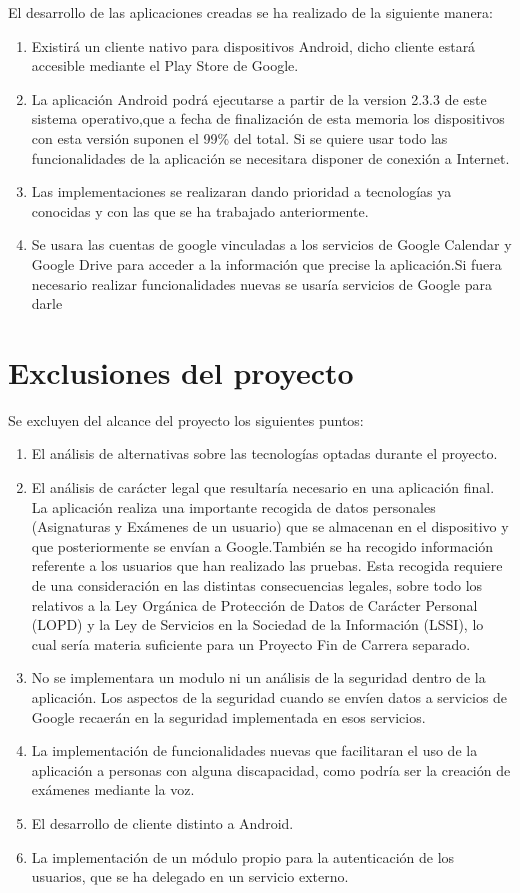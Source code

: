 El desarrollo de las aplicaciones creadas se ha realizado de la siguiente manera:

\begin{enumerate}
	\item Existirá un cliente nativo para dispositivos Android, dicho cliente estará accesible mediante el Play Store de Google.
	\item La aplicación Android podrá ejecutarse a partir de la version 2.3.3 de este sistema operativo,que a fecha de finalización de esta memoria los dispositivos con esta versión suponen el 99\% del total. Si se quiere usar todo las funcionalidades de la aplicación se necesitara disponer de conexión a Internet.
	\item Las implementaciones se realizaran dando prioridad a tecnologías ya conocidas y con las que se ha trabajado anteriormente.
	\item Se usara las cuentas de google vinculadas a los servicios de Google Calendar y Google Drive para acceder a la información que precise la aplicación.Si fuera necesario realizar funcionalidades nuevas se usaría servicios de Google para darle  
\end{enumerate}
\newpage
\section{Exclusiones del proyecto}
\label{secc:Exclusiones}

Se excluyen del alcance del proyecto los siguientes puntos:

\begin{enumerate}
	\item El análisis de alternativas sobre las tecnologías optadas durante el proyecto. 
	\item El análisis de carácter legal que resultaría necesario en una aplicación final. La aplicación realiza una importante recogida de datos personales (Asignaturas y Exámenes de un usuario) que se almacenan en el dispositivo y que posteriormente se envían a Google.También se ha recogido información referente a los usuarios que han realizado las pruebas. Esta recogida requiere de una consideración en las distintas consecuencias legales, sobre todo los relativos a la Ley Orgánica de Protección de Datos de Carácter Personal (LOPD) y la Ley de Servicios en la Sociedad de la Información (LSSI), lo cual sería materia suficiente para un Proyecto Fin de Carrera separado.
	\item No se implementara un modulo ni un análisis de la seguridad dentro de la aplicación. Los aspectos de la seguridad cuando se envíen datos a servicios de Google recaerán en la seguridad implementada en esos servicios.
	\item La implementación de funcionalidades nuevas que facilitaran el uso de la aplicación a personas con alguna discapacidad, como podría ser la creación de exámenes mediante la voz. 
	\item El desarrollo de cliente distinto a Android.
	\item La implementación de un módulo propio para la autenticación de los usuarios, que se ha delegado en un servicio externo.
\end{enumerate}

